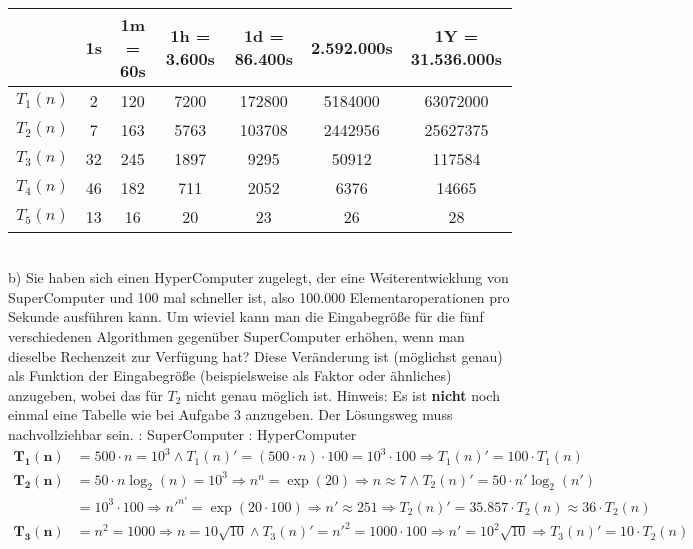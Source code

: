 \documentclass{article}
\begin{document}
\begin{flushleft}
\newline\\
\begin{tabular}{||l|c|c|c|c|c|c||}
\hline & 1s & 1m = 60s & 1h = 3.600s & 1d = 86.400s & 2.592.000s & 1Y = 31.536.000s \\
\hline $T_1(n)$ & 2 & 120 & 7200 & 172800 & 5184000 & 63072000 \\
\hline $T_2(n)$ & 7 & 163 & 5763 & 103708 & 2442956 & 25627375 \\
\hline $T_3(n)$ & 32 & 245 & 1897 & 9295 & 50912 & 117584 \\
\hline $T_4(n)$ & 46 & 182 & 711 & 2052 & 6376 & 14665 \\
\hline $T_5(n)$ & 13 & 16 & 20 & 23 & 26 & 28 \\
\hline
\end{tabular}
\newline\\
b) Sie haben sich einen HyperComputer zugelegt, der eine Weiterentwicklung von SuperComputer und 100 mal schneller 
ist, also 100.000 Elementaroperationen pro Sekunde ausführen kann. Um wieviel kann man die Eingabegröße für die fünf 
verschiedenen Algorithmen gegenüber SuperComputer erhöhen, wenn man dieselbe Rechenzeit zur Verfügung hat? 
Diese Veränderung ist (möglichst genau) als Funktion der Eingabegröße (beispielsweise als Faktor oder ähnliches) 
anzugeben, wobei das für $T_2$ nicht genau möglich ist.
\newline
Hinweis: Es ist \textbf{nicht} noch einmal eine Tabelle wie bei Aufgabe 3 anzugeben. Der Lösungsweg muss
nachvollziehbar sein.
\newline
{}: SuperComputer \qquad {}: HyperComputer
\begin{align*}
    \bm{T_1(n)} &= 500 \cdot n = 10^3 \land T_1(n)' = (500 \cdot n) \cdot 100 = 10^3 \cdot 100 \Longrightarrow T_1(n)' = 100 \cdot T_1(n) \\
    \bm{T_2(n)} &= 50 \cdot n\log_2(n) = 10^3 \Longrightarrow n^n = \exp(20) \Longrightarrow n \approx 7 \land T_2(n)' = 50 \cdot n'\log_2(n') \\
    &= 10^3 \cdot 100 \Longrightarrow n'^{n'} = \exp(20 \cdot 100) \Longrightarrow n' \approx 251 \Longrightarrow 
    T_2(n)' = 35.857 \cdot T_2(n) \approx 36 \cdot T_2(n) \\
    \bm{T_3(n)} &= n^2 = 1000 \Longrightarrow n = 10 \sqrt{10} \land T_3(n)' = n'^2 = 1000 \cdot 100 \Longrightarrow n' = 10^2 \sqrt{10} 
    \Longrightarrow T_3(n)' = 10 \cdot T_2(n) \\

\end{align*}
\end{flushleft}
\end{document}
